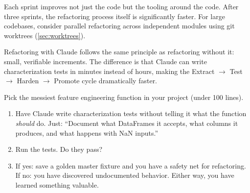 Each sprint improves not just the code but the tooling around the code.
After three sprints, the refactoring process itself is significantly faster.
For large codebases, consider parallel refactoring across independent
modules using git worktrees (\cref{sec:worktrees}).

\begin{keyinsight}
Refactoring with Claude follows the same principle as refactoring without it:
small, verifiable increments. The difference is that Claude can write
characterization tests in minutes instead of hours, making the
Extract $\rightarrow$ Test $\rightarrow$ Harden $\rightarrow$ Promote cycle
dramatically faster.
\end{keyinsight}

\begin{trybox}
Pick the messiest feature engineering function in your project (under 100 lines).
\begin{enumerate}
  \item Have Claude write characterization tests without telling it
    what the function \emph{should} do. Just: ``Document what DataFrames
    it accepts, what columns it produces, and what happens with NaN inputs.''
  \item Run the tests. Do they pass?
  \item If yes: save a golden master fixture and you have a safety net
    for refactoring. If no: you have discovered undocumented behavior.
    Either way, you have learned something valuable.
\end{enumerate}
\end{trybox}
